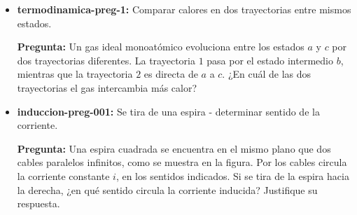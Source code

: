 \documentclass[a4paper,11pt,dvipsnames]{article}
\begin{document}
\begin{itemize}
\newpage

\item \textbf{termodinamica-preg-1:} Comparar calores en dos trayectorias entre mismos estados. \par\medskip

  \begin{center}
  \begin{minipage}{0.60\linewidth}
  \textbf{Pregunta:} Un gas ideal monoatómico evoluciona entre los estados $a$ y $c$ por dos trayectorias diferentes. La trayectoria $1$ pasa por el estado intermedio $b$, mientras que la trayectoria $2$ es directa de $a$ a $c$. ¿En cuál de las dos trayectorias el gas intercambia más calor?

  \begin{center}
  \end{center}
  \end{minipage}
  \end{center}


\item \textbf{induccion-preg-001:} Se tira de una espira - determinar sentido de la corriente. \par\medskip

  \begin{center}
  \begin{minipage}{0.60\linewidth}
  \textbf{Pregunta:} Una espira cuadrada se encuentra en el mismo plano que dos cables paralelos infinitos, como se muestra en la figura. Por los cables circula la corriente constante $i$, en los sentidos indicados. Si se tira de la espira hacia la derecha, ¿en qué sentido circula la corriente inducida? Justifique su respuesta.


\end{minipage}
\end{center}
\end{itemize}
\end{document}
